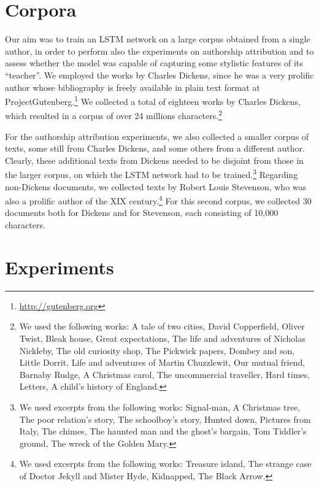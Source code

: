 \documentclass[journal]{IEEEtran}
\begin{document}
\section{Corpora}
\label{sec:corpora}

Our aim was to train an LSTM network on a large corpus obtained from a single author, in order to perform also the experiments on authorship attribution and to assess whether the model was capable of capturing some stylistic features of its ``teacher''. We employed the works by Charles Dickens, since he was a very prolific author whose bibliography is freely available in plain text format at ProjectGutenberg.\footnote{\url{http://gutenberg.org}}
%
We collected a total of eighteen works by Charles Dickens, which resulted in a corpus of over 24 millions characters.\footnote{We used the following works: A tale of two cities, David Copperfield, Oliver Twist, Bleak house, Great expectations, The life and adventures of Nicholas Nickleby, The old curiosity shop, The Pickwick papers, Dombey and son, Little Dorrit, Life and adventures of Martin Chuzzlewit, Our mutual friend, Barnaby Rudge, A Christmas carol, The uncommercial traveller, Hard times, Letters, A child's history of England.}

For the authorship attribution experiments, we also collected a smaller corpus of texts, some still from Charles Dickens, and some others from a different author. Clearly, these additional texts from Dickens needed to be disjoint from those in the larger corpus, on which the LSTM network had to be trained.\footnote{We used excerpts from the following works: Signal-man, A Christmas tree, The poor relation's story, The schoolboy's story, Hunted down, Pictures from Italy, The chimes, The haunted man and the ghost's bargain, Tom Tiddler's ground, The wreck of the Golden Mary.} Regarding non-Dickens documents, we collected texts by Robert Louis Stevenson, who was also a prolific author of the XIX century.\footnote{We used excerpts from the following works: Treasure island, The strange case of Doctor Jekyll and Mister Hyde, Kidnapped, The Black Arrow.} For this second corpus, we collected 30 documents both for Dickens and for Stevenson, each consisting of 10,000 characters.



\section{Experiments}
\label{sec:experiments}
\end{document}
